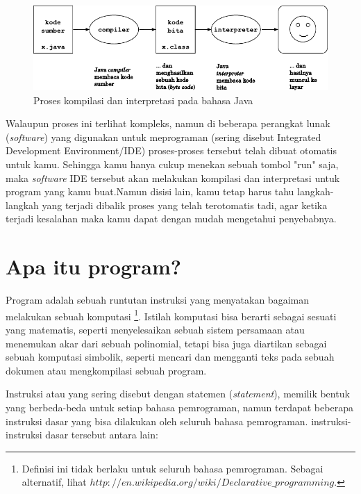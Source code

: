 \begin{figure}[H]
	\centering \includegraphics{images/compilingProcess.pdf}
	\caption{Proses kompilasi dan interpretasi pada bahasa Java}
	\label{fig:binaryTreeRekursif}
\end{figure}

Walaupun proses ini terlihat kompleks, namun di beberapa perangkat lunak (\textit{software}) yang digunakan untuk meprograman (sering disebut Integrated Development Environment/IDE) proses-proses tersebut telah dibuat otomatis untuk kamu. Sehingga kamu hanya cukup menekan sebuah tombol "run" saja, maka \textit{software} IDE tersebut akan melakukan kompilasi dan interpretasi untuk program yang kamu buat.Namun disisi lain, kamu tetap harus tahu langkah-langkah yang terjadi dibalik proses yang telah terotomatis tadi, agar ketika terjadi kesalahan maka kamu dapat dengan mudah mengetahui penyebabnya.

\section{Apa itu program?} 

Program adalah sebuah runtutan instruksi yang menyatakan bagaiman melakukan sebuah komputasi \footnote{Definisi ini tidak berlaku untuk seluruh bahasa pemrograman. Sebagai alternatif, lihat $http://en.wikipedia.org/wiki/Declarative\_programming$.}. Istilah komputasi bisa berarti sebagai sesuati yang matematis, seperti menyelesaikan sebuah sistem persamaan atau menemukan akar dari sebuah polinomial, tetapi bisa juga diartikan sebagai sebuah komputasi simbolik, seperti mencari dan mengganti teks pada sebuah dokumen atau mengkompilasi sebuah program. 

Instruksi atau yang sering disebut dengan statemen (\textit{statement}), memilik bentuk yang berbeda-beda untuk setiap bahasa pemrograman, namun terdapat beberapa instruksi dasar yang bisa dilakukan oleh seluruh bahasa pemrograman. instruksi-instruksi dasar tersebut antara lain:

